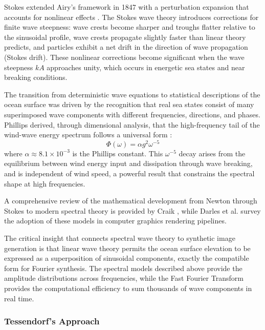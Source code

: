     Stokes extended Airy's framework in 1847 with a perturbation expansion that accounts for nonlinear effects \cite{Stokes1847}. The Stokes wave theory introduces corrections for finite wave steepness: wave crests become sharper and troughs flatter relative to the sinusoidal profile, wave crests propagate slightly faster than linear theory predicts, and particles exhibit a net drift in the direction of wave propagation (Stokes drift). These nonlinear corrections become significant when the wave steepness $kA$ approaches unity, which occurs in energetic sea states and near breaking conditions.

    The transition from deterministic wave equations to statistical descriptions of the ocean surface was driven by the recognition that real sea states consist of many superimposed wave components with different frequencies, directions, and phases. Phillips derived, through dimensional analysis, that the high-frequency tail of the wind-wave energy spectrum follows a universal form \cite{Phillips1958}:
    \begin{equation}
        \Phi(\omega) = \alpha g^2 \omega^{-5}
        \label{eq:phillips_spectrum}
    \end{equation}
    where $\alpha \approx 8.1 \times 10^{-3}$ is the Phillips constant. This $\omega^{-5}$ decay arises from the equilibrium between wind energy input and dissipation through wave breaking, and is independent of wind speed, a powerful result that constrains the spectral shape at high frequencies.

    A comprehensive review of the mathematical development from Newton through Stokes to modern spectral theory is provided by Craik \cite{Craik2004}, while Darles et al. \cite{Darles2011} survey the adoption of these models in computer graphics rendering pipelines.

    The critical insight that connects spectral wave theory to synthetic image generation is that linear wave theory permits the ocean surface elevation to be expressed as a superposition of sinusoidal components, exactly the compatible form for Fourier synthesis. The spectral models described above provide the amplitude distributions across frequencies, while the Fast Fourier Transform provides the computational efficiency to sum thousands of wave components in real time.

    \subsubsection{Tessendorf's Approach}

